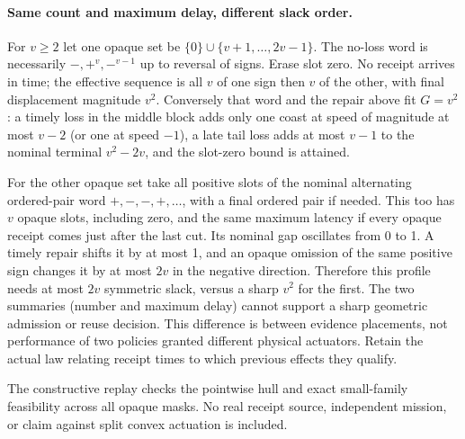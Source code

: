 \documentclass{article}
\begin{document}
\paragraph{Same count and maximum delay, different slack order.}
For \(v\ge2\) let one opaque set be
\(\{0\}\cup\{v+1,\ldots,2v-1\}\).
The no-loss word is necessarily \(-,+^{v},-^{v-1}\)
up to reversal of signs. Erase slot zero. No receipt arrives
in time; the effective sequence is all \(v\) of one sign
then \(v\) of the other, with final displacement magnitude
\(v^2\). Conversely that word and the repair above
fit \(G=v^2\): a timely loss in the middle block adds
only one coast at speed of magnitude at most \(v-2\)
(or one at speed \(-1\)), a late tail loss adds at most
\(v-1\) to the nominal terminal \(v^2-2v\), and the
slot-zero bound is attained.

For the other opaque set take all positive slots of
the nominal alternating ordered-pair word
\(+, -,-,+,\ldots\), with a final ordered pair
if needed. This too has \(v\) opaque slots, including
zero, and the same maximum latency if every opaque
receipt comes just after the last cut. Its nominal gap
oscillates from 0 to 1. A timely repair shifts it
by at most 1, and an opaque omission of the same
positive sign changes it by at most \(2v\) in the negative
direction. Therefore this profile needs at most \(2v\)
symmetric slack, versus a sharp \(v^2\) for the first.
The two summaries (number and maximum delay) cannot
support a sharp geometric admission or reuse decision.
This difference is between evidence placements, not
performance of two policies granted different physical
actuators. Retain the actual law relating receipt times
to which previous effects they qualify.

The constructive replay checks the pointwise hull and
exact small-family feasibility across all opaque masks.
No real receipt source, independent mission, or claim
against split convex actuation is included.
\end{document}
